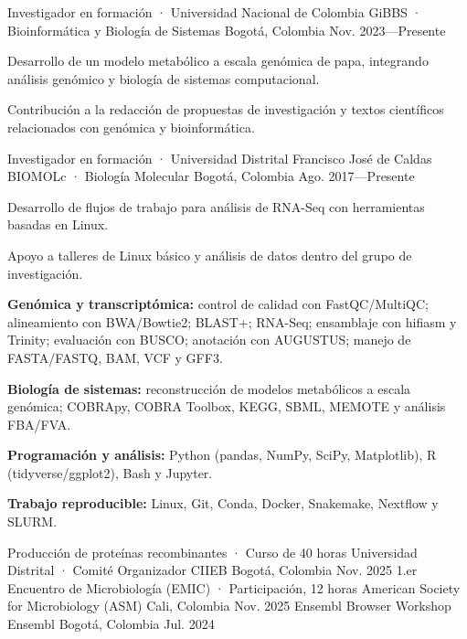 \documentclass[11pt,letterpaper]{awesome-cv}
\renewenvironment{cvparagraph}{\par\vspace{2mm}\paragraphstyle}{\par\vspace{2mm}}
\begin{document}
\newpage
{}
\begin{cventries}
\cventry
{Investigador en formación · Universidad Nacional de Colombia}
{GiBBS · Bioinformática y Biología de Sistemas}
{Bogotá, Colombia}
{Nov. 2023---Presente}
{\begin{cvitems}
\item {Desarrollo de un modelo metabólico a escala genómica de papa, integrando análisis genómico y biología de sistemas computacional.}
\item {Contribución a la redacción de propuestas de investigación y textos científicos relacionados con genómica y bioinformática.}
\end{cvitems}}

\cventry
{Investigador en formación · Universidad Distrital Francisco José de Caldas}
{BIOMOLc · Biología Molecular}
{Bogotá, Colombia}
{Ago. 2017---Presente}
{\begin{cvitems}
\item {Desarrollo de flujos de trabajo para análisis de RNA-Seq con herramientas basadas en Linux.}
\item {Apoyo a talleres de Linux básico y análisis de datos dentro del grupo de investigación.}
\end{cvitems}}
\end{cventries}

\begin{cvparagraph}
\textbf{Genómica y transcriptómica:} control de calidad con FastQC/MultiQC; alineamiento con BWA/Bowtie2; BLAST+; RNA-Seq; ensamblaje con hifiasm y Trinity; evaluación con BUSCO; anotación con AUGUSTUS; manejo de FASTA/FASTQ, BAM, VCF y GFF3.\par
\textbf{Biología de sistemas:} reconstrucción de modelos metabólicos a escala genómica; COBRApy, COBRA Toolbox, KEGG, SBML, MEMOTE y análisis FBA/FVA.\par
\textbf{Programación y análisis:} Python (pandas, NumPy, SciPy, Matplotlib), R (tidyverse/ggplot2), Bash y Jupyter.\par
\textbf{Trabajo reproducible:} Linux, Git, Conda, Docker, Snakemake, Nextflow y SLURM.
\end{cvparagraph}

\begin{cventries}
\cventry
{Producción de proteínas recombinantes · Curso de 40 horas}
{Universidad Distrital · Comité Organizador CIIEB}
{Bogotá, Colombia}
{Nov. 2025}
{}
\cventry
{1.er Encuentro de Microbiología (EMIC) · Participación, 12 horas}
{American Society for Microbiology (ASM)}
{Cali, Colombia}
{Nov. 2025}
{}
\cventry
{Ensembl Browser Workshop}
{Ensembl}
{Bogotá, Colombia}
{Jul. 2024}
{}
\end{cventries}
\end{document}
